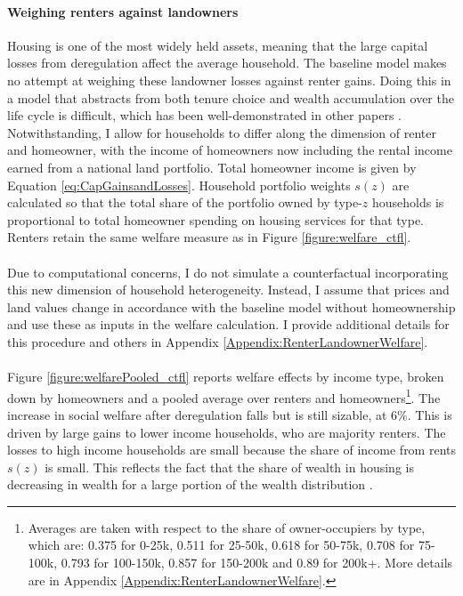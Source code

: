 \documentclass[12pt]{article}
\begin{document}
\paragraph*{Weighing renters against landowners} 

Housing is one of the most widely held assets, meaning that the large capital losses from deregulation affect the average household. The baseline model makes no attempt at weighing these landowner losses against renter gains. Doing this in a model that abstracts from both tenure choice and wealth accumulation over the life cycle is difficult, which has been well-demonstrated in other papers \citep{Greaney}. Notwithstanding, I allow for households to differ along the dimension of renter and homeowner, with the income of homeowners now including the rental income earned from a national land portfolio. Total homeowner income is given by Equation \eqref{eq:CapGainsandLosses}. Household portfolio weights $s(z)$ are calculated so that the total share of the portfolio owned by type-$z$ households is proportional to total homeowner spending on housing services for that type. Renters retain the same welfare measure as in Figure \ref{figure:welfare_ctfl}. 

\paragraph*{}
Due to computational concerns, I do not simulate a counterfactual incorporating this new dimension of household heterogeneity. Instead, I assume that prices and land values change in accordance with the baseline model without homeownership and use these as inputs in the welfare calculation. I provide additional details for this procedure and others in Appendix \ref{Appendix:RenterLandownerWelfare}.

\paragraph*{}
Figure \ref{figure:welfarePooled_ctfl} reports welfare effects by income type, broken down by homeowners and a pooled average over renters and homeowners\footnote{Averages are taken with respect to the share of owner-occupiers by type, which are: 0.375 for 0-25k, 0.511 for 25-50k, 0.618 for 50-75k, 0.708 for 75-100k, 0.793 for 100-150k,  0.857 for 150-200k and 0.89 for 200k+. More details are in Appendix \ref{Appendix:RenterLandownerWelfare}.}. The increase in social welfare after deregulation falls  but is still sizable, at $6 \%$. This is driven by large gains to lower income households, who are majority renters. The losses to high income households are small because the share of income from rents $s(z)$ is small. This reflects the fact that the share of wealth in housing is decreasing in wealth for a large portion of the wealth distribution \citep{Greaney}.
\end{document}
